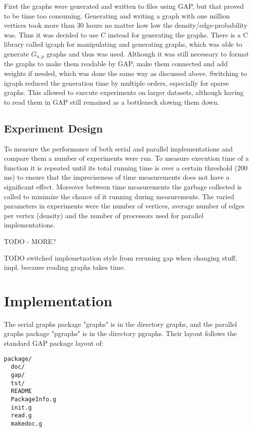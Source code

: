 \documentclass{report}
\theoremstyle{plain}
\theoremstyle{definition}
\theoremstyle{remark}
\begin{document}
First the graphs were generated and written to files using GAP, but that proved to be time too consuming. Generating and writing a graph with one million vertices took more than 30 hours no matter how low the density/edge-probability was. Thus it was decided to use C instead for generating the graphs. There is a C library called igraph for manipulating and generating graphs, which was able to generate $G_{n,p}$ graphs and thus was used. Although it was still necessary to format the graphs to make them readable by GAP, make them connected and add weights if needed, which was done the same way as discussed above. Switching to igraph reduced the generation time by multiple orders, especially for sparse graphs. This allowed to execute experiments on larger datasets, although having to read them in GAP still remained as a bottleneck slowing them down.

\subsection{Experiment Design}

To measure the performance of both serial and parallel implementations and compare them a number of experiments were run. To measure execution time of a function it is repeated until its total running time is over a certain threshold (200 ms) to ensure that the impreciseness of time measurements does not have a significant effect. Moreover between time measurements the garbage collected is called to minimize the chance of it running during measurements. The varied parameters in experiments were the number of vertices, average number of edges per vertex (density) and the number of processors used for parallel implementations.

TODO - MORE?

TODO switched implemetnation style from reruning gap when changing stuff, impl. because reading graphs takes time.

\section{Implementation}

The serial graphs package "graphs" is in the directory graphs, and the parallel graphs package "pgraphs" is in the directory pgraphs. Their layout follows the standard GAP package layout of:

\begin{lstlisting}
package/
  doc/
  gap/
  tst/
  README
  PackageInfo.g
  init.g
  read.g
  makedoc.g
\end{lstlisting}
\end{document}
